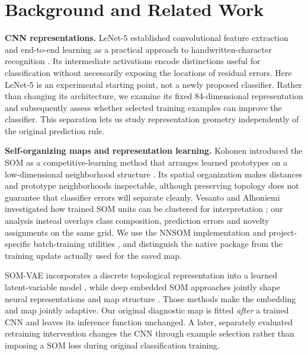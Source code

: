 \documentclass[11pt]{article}
\begin{document}
\section{Background and Related Work}\label{sec:related}
\textbf{CNN representations.} LeNet-5 established convolutional feature extraction and end-to-end learning as a practical approach to handwritten-character recognition \parencite{lecun1998gradient}. Its intermediate activations encode distinctions useful for classification without necessarily exposing the locations of residual errors. Here LeNet-5 is an experimental starting point, not a newly proposed classifier. Rather than changing its architecture, we examine its fixed 84-dimensional representation and subsequently assess whether selected training examples can improve the classifier. This separation lets us study representation geometry independently of the original prediction rule.

\textbf{Self-organizing maps and representation learning.} Kohonen introduced the SOM as a competitive-learning method that arranges learned prototypes on a low-dimensional neighborhood structure \parencite{kohonen1990som}. Its spatial organization makes distances and prototype neighborhoods inspectable, although preserving topology does not guarantee that classifier errors will separate cleanly. Vesanto and Alhoniemi investigated how trained SOM units can be clustered for interpretation \parencite{vesanto2000clustering}; our analysis instead overlays class composition, prediction errors and novelty assignments on the same grid. We use the NNSOM implementation and project-specific batch-training utilities \parencite{jafari_nnsom}, and distinguish the native package from the training update actually used for the saved map.

SOM-VAE incorporates a discrete topological representation into a learned latent-variable model \parencite{fortuin2019somvae}, while deep embedded SOM approaches jointly shape neural representations and map structure \parencite{forest2021desom}. Those methods make the embedding and map jointly adaptive. Our original diagnostic map is fitted \emph{after} a trained CNN and leaves its inference function unchanged. A later, separately evaluated retraining intervention changes the CNN through example selection rather than imposing a SOM loss during original classification training.
\end{document}
